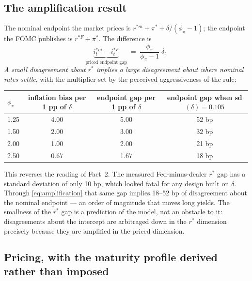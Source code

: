 \subsection{The amplification result}

The nominal endpoint the market prices is $r^{*m} + \pi^{*} + \delta/(\phi_\pi-1)$; the endpoint
the FOMC publishes is $r^{*F} + \pi^{*}$. The difference is
\begin{equation}
\boxed{\;\underbrace{i^{*m}_t - i^{*F}_t}_{\text{priced endpoint gap}} \;=\; \frac{\phi_\pi}{\phi_\pi-1}\;\delta_t\;}
\label{eq:amplification}
\end{equation}
\emph{A small disagreement about $r^{*}$ implies a large disagreement about where nominal rates
settle}, with the multiplier set by the perceived aggressiveness of the rule:

\begin{center}\small
\begin{tabular}{lccc}
\toprule
$\phi_\pi$ & inflation bias per 1 pp of $\delta$ & endpoint gap per 1 pp of $\delta$ & endpoint gap when sd$(\delta)=0.105$\\ \midrule
1.25 & 4.00 & 5.00 & 52 bp\\
1.50 & 2.00 & 3.00 & 32 bp\\
2.00 & 1.00 & 2.00 & 21 bp\\
2.50 & 0.67 & 1.67 & 18 bp\\
\bottomrule\end{tabular}
\end{center}

\noindent This reverses the reading of Fact~2. The measured Fed-minus-dealer $r^{*}$ gap has a
standard deviation of only 10 bp, which looked fatal for any design built on $\delta$. Through
\eqref{eq:amplification} that same gap implies 18--52 bp of disagreement about the nominal
endpoint --- an order of magnitude that moves long yields. The smallness of the $r^{*}$ gap is a
prediction of the model, not an obstacle to it: disagreements about the intercept are arbitraged
down in the $r^{*}$ dimension precisely because they are amplified in the priced dimension.

\subsection{Pricing, with the maturity profile derived rather than imposed}

